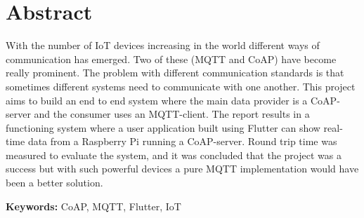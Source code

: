 \pagebreak
\section*{Abstract}
\label{ch:eng-abstract}
With the number of IoT devices increasing in the world different ways of communication has emerged. Two of these (MQTT and CoAP) have become really prominent. The problem with different communication standards is that sometimes different systems need to communicate with one another. This project aims to build an end to end system where the main data provider is a CoAP-server and the consumer uses an MQTT-client. The report results in a functioning system where a user application built using Flutter can show real-time data from a Raspberry Pi running a CoAP-server. Round trip time was measured to evaluate the system, and it was concluded that the project was a success but with such powerful devices a pure MQTT implementation would have been a better solution.

\textbf{Keywords:} CoAP, MQTT, Flutter, IoT
